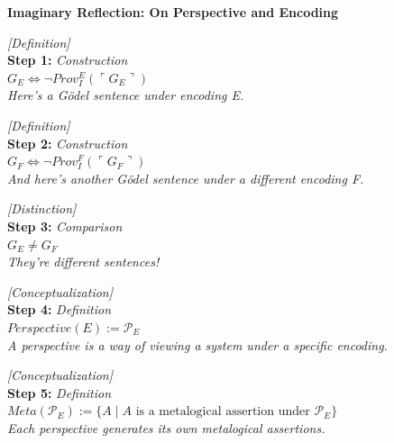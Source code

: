 \documentclass[runningheads]{llncs}
\begin{document}
\begin{center}
\textbf{Imaginary Reflection: On Perspective and Encoding}
\end{center}

\vspace{0.5em}

\noindent\textit{[Definition]}\\
\noindent\textbf{Step 1:} \hfill \textit{Construction}\\
\noindent$G_E \Leftrightarrow \neg Prov_I^E(\ulcorner G_E \urcorner)$\\
\textit{Here's a Gödel sentence under encoding E.}

\vspace{0.8em}

\noindent\textit{[Definition]}\\
\noindent\textbf{Step 2:} \hfill \textit{Construction}\\
\noindent$G_F \Leftrightarrow \neg Prov_I^F(\ulcorner G_F \urcorner)$\\
\textit{And here's another Gödel sentence under a different encoding F.}

\vspace{0.8em}

\noindent\textit{[Distinction]}\\
\noindent\textbf{Step 3:} \hfill \textit{Comparison}\\
\noindent$G_E \neq G_F$\\
\textit{They're different sentences!}

\vspace{0.8em}

\noindent\textit{[Conceptualization]}\\
\noindent\textbf{Step 4:} \hfill \textit{Definition}\\
\noindent$Perspective(E) := \mathcal{P}_E$\\
\textit{A perspective is a way of viewing a system under a specific encoding.}

\vspace{0.8em}

\noindent\textit{[Conceptualization]}\\
\noindent\textbf{Step 5:} \hfill \textit{Definition}\\
\noindent$Meta(\mathcal{P}_E) := \{A \mid A \text{ is a metalogical assertion under } \mathcal{P}_E\}$\\
\textit{Each perspective generates its own metalogical assertions.}

\vspace{0.8em}
\end{document}
